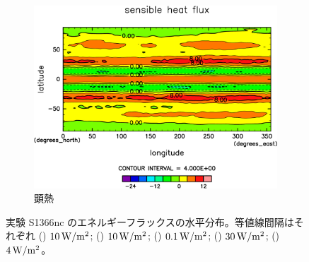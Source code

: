 \documentclass[body]{subfiles}
\begin{document}
\begin{figure}[t]
\begin{subfigure}{.4\textwidth}
		\includegraphics[width=\columnwidth]{S1366-nc/Sens,time=3650:4015-crop-rotate.pdf}
		\caption{顕熱\hmu*{[W/m^{-2}]}}\label{S1366nc顕熱}
	\end{subfigure}
	\caption[実験 S1366nc のエネルギーフラックスの水平分布]{
		実験 S1366nc のエネルギーフラックスの水平分布。等値線間隔はそれぞれ
		() \(10\hmu{W/m^2}\);
		() \(10\hmu{W/m^2}\);
		() \(0.1\hmu{W/m^2}\);
		() \(30\hmu{W/m^2}\);
		() \(4\hmu{W/m^2}\)。
	}\label{S1366nc_heat}
\end{figure}
\end{document}
